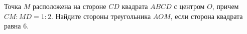\begin{ex}
	\begin{condition}
		Точка \( M  \) расположена на стороне \( CD  \) квадрата \( ABCD  \) с центром \( O \), причем \( CM : MD = 1 : 2 \). Найдите стороны треугольника \( AOM \), если сторона квадрата равна \( 6 \).
	\end{condition}
\end{ex}